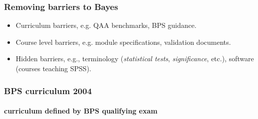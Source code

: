 \begin{frame}
	\frametitle{Removing barriers to Bayes}

	\begin{itemize}
		\item Curriculum barriers, e.g. QAA benchmarks, BPS guidance.
		\item Course level barriers, e.g. module specifications, validation documents.
		\item Hidden barriers, e.g., terminology (\emph{statistical tests}, \emph{significance}, etc.), software (courses teaching SPSS).
	\end{itemize}

\end{frame}

\begin{frame}
	\frametitle{BPS curriculum 2004}

	\framesubtitle{curriculum defined by BPS qualifying exam}


\end{frame}
